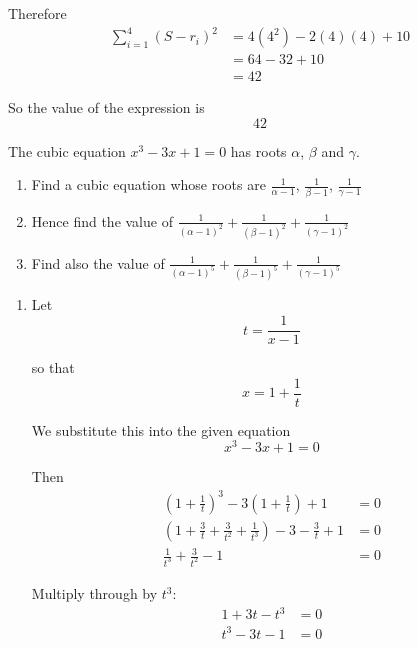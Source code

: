 \documentclass[leqno]{article}
\begin{document}
\begin{enumerate}[
  label=\textbf{\arabic*.},
  leftmargin=*,
  topsep=0pt,
  partopsep=0pt,
  parsep=0pt
]
\begin{djsSolution}
\begin{enumerate}[label=\textbf{(\alph*)}]
  Therefore
  \begin{align*}
  \sum_{i=1}^4 (S-r_i)^2
  &=4(4^2)-2(4)(4)+10\\
  &=64-32+10\\
  &=42
  \end{align*}

  So the value of the expression is
  \[
  42
  \]
\end{enumerate}
\end{djsSolution}


\newpage

\questionitem

The cubic equation $x^3-3x+1=0$ has roots $\alpha$, $\beta$ and $\gamma$. \\

\begin{enumerate}[label=\textbf{(\alph*)}]
  \item Find a cubic equation whose roots are $\frac{1}{\alpha-1}$, $\frac{1}{\beta-1}$, $\frac{1}{\gamma-1}$  \\
  \item Hence find the value of $\frac{1}{(\alpha-1)^2}+\frac{1}{(\beta-1)^2}+\frac{1}{(\gamma-1)^2}$  \\
  \item Find also the value of $\frac{1}{(\alpha-1)^5}+\frac{1}{(\beta-1)^5}+\frac{1}{(\gamma-1)^5}$  \\
\end{enumerate}

\vspace*{10pt}

\begin{djsSolution}
\begin{enumerate}[label=\textbf{(\alph*)}]
  \item Let
\[
t=\frac{1}{x-1}
\]

so that
\[
x=1+\frac{1}{t}
\]

We substitute this into the given equation
\[
x^3-3x+1=0
\]

Then
\begin{align*}
\left(1+\frac{1}{t}\right)^3-3\left(1+\frac{1}{t}\right)+1&=0\\
\left(1+\frac{3}{t}+\frac{3}{t^2}+\frac{1}{t^3}\right)-3-\frac{3}{t}+1&=0\\
\frac{1}{t^3}+\frac{3}{t^2}-1&=0
\end{align*}

Multiply through by $t^3$:
\begin{align*}
1+3t-t^3&=0\\
t^3-3t-1&=0
\end{align*}


\end{enumerate}
\end{djsSolution}
\end{enumerate}
\end{document}
